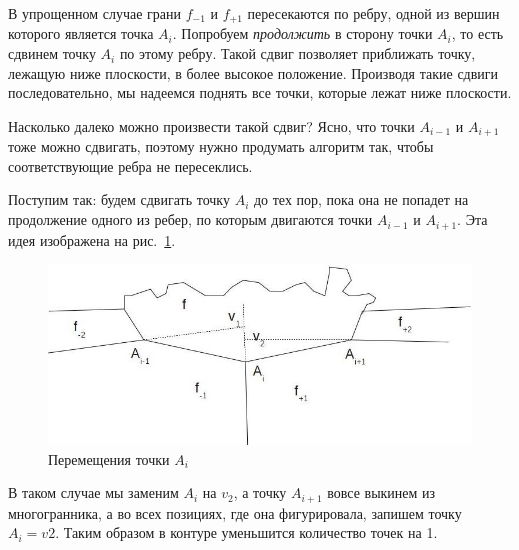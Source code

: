 \documentclass[a4paper,12pt, titlepage]{article}
\begin{document}
\begin{flushleft}
  В упрощенном случае грани $f_{-1}$ и $f_{+1}$ пересекаются по ребру, одной из вершин которого является
точка $A_{i}$. Попробуем \textit{продолжить} в сторону точки $A_{i}$, то есть сдвинем точку $A_{i}$ 
по этому ребру. Такой сдвиг позволяет приближать точку, лежащую ниже плоскости, в более высокое 
положение. Производя такие сдвиги последовательно, мы надеемся поднять все точки, которые лежат ниже 
плоскости.
\end{flushleft}
\begin{flushleft}
  Насколько далеко можно произвести такой сдвиг? Ясно, что точки $A_{i - 1}$ и $A_{i + 1}$ тоже можно
сдвигать, поэтому нужно продумать алгоритм так, чтобы соответствующие ребра не пересеклись.
\end{flushleft}
\begin{flushleft}
  Поступим так: будем сдвигать точку $A_{i}$ до тех пор, пока она не попадет на продолжение одного из 
ребер, по которым двигаются точки $A_{i - 1}$ и $A_{i + 1}$. Эта идея изображена на рис.~\ref{pic-step-3}.
\end{flushleft}
\begin{flushleft}
  \begin{figure}[h]
    \includegraphics[clip, width=13cm]{img/pic-step-3.jpg}
    \caption{Перемещения точки $A_{i}$}\label{pic-step-3}
  \end{figure}
\end{flushleft}
\begin{flushleft}
  В таком случае мы заменим $A_{i}$ на $v_{2}$, а точку $A_{i + 1}$ вовсе выкинем из многогранника, а во
всех позициях, где она фигурировала, запишем точку $A_{i} = v{2}$. Таким образом в контуре уменьшится
количество точек на 1.
\end{flushleft}
\end{document}
